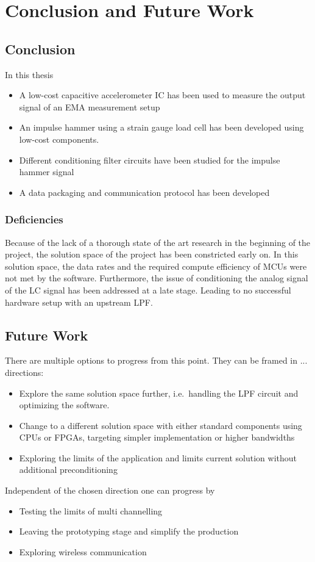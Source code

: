 \chapter{Conclusion and Future Work}

\section{Conclusion}
In this thesis
\begin{itemize}
  \item A low-cost capacitive accelerometer \ac{IC} has been used to measure the output signal of an \ac{EMA} measurement setup
  \item An impulse hammer using a strain gauge load cell has been developed using low-cost components.
  \item Different conditioning filter circuits have been studied for the impulse hammer signal
  \item A data packaging and communication protocol has been developed
\end{itemize}

\subsection{Deficiencies}
Because of the lack of a thorough state of the art research in the beginning of the project, the solution space of the project has been constricted early on. In this solution space, the data rates and the required compute efficiency of \ac{MCU}s were not met by the software. Furthermore, the issue of conditioning the analog signal of the \ac{LC} signal has been addressed at a late stage. Leading to no successful hardware setup with an upstream \ac{LPF}.

\newpage
\section{Future Work}
There are multiple options to progress from this point. They can be framed in ... directions:
\begin{itemize}
  \item Explore the same solution space further, i.e.\ handling the \ac{LPF} circuit and optimizing the software.
  \item Change to a different solution space with either standard components using \ac{CPU}s or \ac{FPGA}s, targeting simpler implementation or higher bandwidths
  \item Exploring the limits of the application and limits current solution without additional preconditioning
\end{itemize}

Independent of the chosen direction one can progress by
\begin{itemize}
  \item Testing the limits of multi channelling
  \item Leaving the prototyping stage and simplify the production
  \item Exploring wireless communication
\end{itemize}
